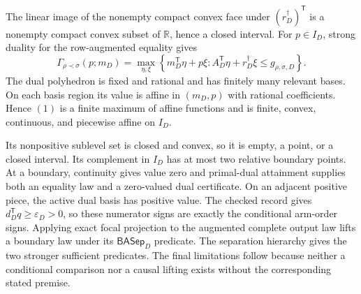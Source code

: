 The linear image of the nonempty compact convex face under \((r_D^\dagger)^{\mathsf T}\) is a nonempty compact convex subset of \(\mathbb R\), hence a closed interval.  For \(p\in I_D\), strong duality for the row-augmented equality gives
\[
\Gamma_{\rho\prec\sigma}(p;m_D)
=\max_{\eta,\xi}
\left\{m_D^{\mathsf T}\eta+p\xi:
A_D^{\mathsf T}\eta+r_D^\dagger\xi
\leq g_{\rho,\sigma,D}\right\}.
\tag{1}
\]
The dual polyhedron is fixed and rational and has finitely many relevant bases.  On each basis region its value is affine in \((m_D,p)\) with rational coefficients.  Hence \((1)\) is a finite maximum of affine functions and is finite, convex, continuous, and piecewise affine on \(I_D\).

Its nonpositive sublevel set is closed and convex, so it is empty, a point, or a closed interval.  Its complement in \(I_D\) has at most two relative boundary points.  At a boundary, continuity gives value zero and primal-dual attainment supplies both an equality law and a zero-valued dual certificate.  On an adjacent positive piece, the active dual basis has positive value.  The checked record gives \(d_D^{\mathsf T}q\geq\varepsilon_D>0\), so these numerator signs are exactly the conditional arm-order signs.  Applying exact focal projection to the augmented complete output law lifts a boundary law under its \(\mathsf{BASep}_D\) predicate.  The separation hierarchy gives the two stronger sufficient predicates.  The final limitations follow because neither a conditional comparison nor a causal lifting exists without the corresponding stated premise.